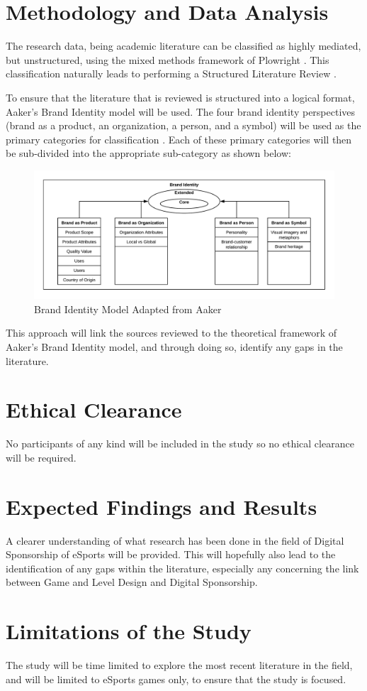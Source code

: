 \documentclass[10pt,twoside]{article}
\begin{document}
\section{Methodology and Data Analysis}

The research data, being academic literature can be classified as highly mediated, but unstructured, using the mixed methods framework of Plowright \cite{plowright2011using}. This classification naturally leads to performing a Structured Literature Review \cite{petticrew2008systematic}.

To ensure that the literature that is reviewed is structured into a logical format, Aaker's Brand Identity model will be used. The four brand identity perspectives (brand as a product, an organization, a person, and a symbol) will be used as the primary categories for classification \cite{aaker2012brand}. Each of these primary categories will then be sub-divided into the appropriate sub-category as shown below:

\begin{figure}[h]
\caption{Brand Identity Model Adapted from Aaker}
\centering
\includegraphics[width=1.2\textwidth]{BrandIdentityModel.png}
\end{figure}

This approach will link the sources reviewed to the theoretical framework of Aaker's Brand Identity model, and through doing so, identify any gaps in the literature.

\section{Ethical Clearance}
No participants of any kind will be included in the study so no ethical clearance will be required.

\section{Expected Findings and Results}
A clearer understanding of what research has been done in the field of Digital Sponsorship of eSports will be provided. This will hopefully also lead to the identification of any gaps within the literature, especially any concerning the link between Game and Level Design and Digital Sponsorship.

\section{Limitations of the Study}
The study will be time limited to explore the most recent literature in the field, and will be limited to eSports games only, to ensure that the study is focused.



\end{document}
